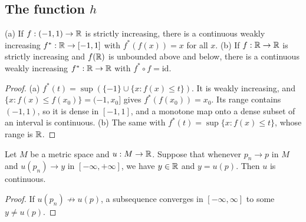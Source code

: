 \subsection{The function $h$}

\begin{lemma}\label{lem:monotone-inverse}
(a) If $f:(-1,1)\to\mathbb{R}$ is strictly increasing, there is a continuous weakly increasing $f^*:\mathbb{R}\to[-1,1]$ with
$f^*(f(x))=x$ for all $x$. (b) If $f:\mathbb{R}\to\mathbb{R}$ is strictly increasing and $f(\mathbb{R})$ is unbounded above and below, there is
a continuous weakly increasing $f^*:\mathbb{R}\to\mathbb{R}$ with $f^*\circ f=\mathrm{id}$.
\end{lemma}
\begin{proof}
(a) $f^*(t)=\sup(\{-1\}\cup\{x:f(x)\le t\})$. It is weakly increasing, and $\{x:f(x)\le f(x_0)\}=(-1,x_0]$ gives
$f^*(f(x_0))=x_0$. Its range contains $(-1,1)$, so it is dense in $[-1,1]$, and a monotone map onto a dense subset of an
interval is continuous. (b) The same with $f^*(t)=\sup\{x:f(x)\le t\}$, whose range is $\mathbb{R}$.
\end{proof}

\begin{lemma}\label{lem:closed-graph}
Let $M$ be a metric space and $u:M\to\mathbb{R}$. Suppose that whenever $p_n\to p$ in $M$ and $u(p_n)\to y$ in
$[-\infty,+\infty]$, we have $y\in\mathbb{R}$ and $y=u(p)$. Then $u$ is continuous.
\end{lemma}
\begin{proof}
If $u(p_n)\not\to u(p)$, a subsequence converges in $[-\infty,\infty]$ to some $y\ne u(p)$.
\end{proof}

